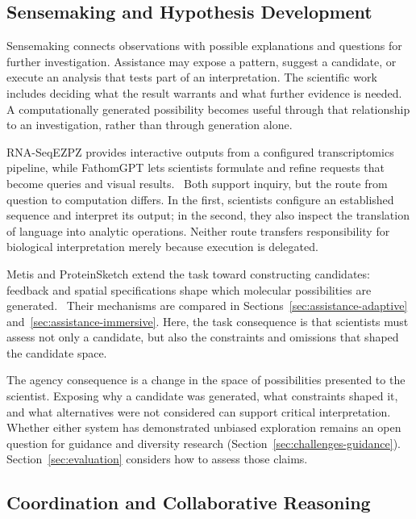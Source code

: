 \subsection{Sensemaking and Hypothesis Development}
\label{sec:tasks-sensemaking}

Sensemaking connects observations with possible explanations and questions for further investigation. Assistance may expose a pattern, suggest a candidate, or execute an analysis that tests part of an interpretation. The scientific work includes deciding what the result warrants and what further evidence is needed. A computationally generated possibility becomes useful through that relationship to an investigation, rather than through generation alone.

RNA-SeqEZPZ provides interactive outputs from a configured transcriptomics pipeline, while FathomGPT lets scientists formulate and refine requests that become queries and visual results.~\cite{AnchorRNASeqEZPZ,AnchorFathomGPT} Both support inquiry, but the route from question to computation differs. In the first, scientists configure an established sequence and interpret its output; in the second, they also inspect the translation of language into analytic operations. Neither route transfers responsibility for biological interpretation merely because execution is delegated.

Metis and ProteinSketch extend the task toward constructing candidates: feedback and spatial specifications shape which molecular possibilities are generated.~\cite{AnchorMetis,AnchorProteinSketch} Their mechanisms are compared in Sections~\ref{sec:assistance-adaptive} and~\ref{sec:assistance-immersive}. Here, the task consequence is that scientists must assess not only a candidate, but also the constraints and omissions that shaped the candidate space.

The agency consequence is a change in the space of possibilities presented to the scientist. Exposing why a candidate was generated, what constraints shaped it, and what alternatives were not considered can support critical interpretation. Whether either system has demonstrated unbiased exploration remains an open question for guidance and diversity research (Section~\ref{sec:challenges-guidance}). Section~\ref{sec:evaluation} considers how to assess those claims.

\subsection{Coordination and Collaborative Reasoning}
\label{sec:tasks-coordination}

